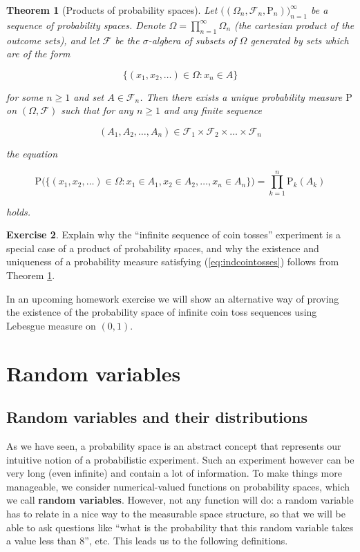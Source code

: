 \documentclass[11pt]{report}
\providecommand{\cal}{\mathcal}
\theoremstyle{plain}
\newtheorem{thm}{Theorem}[chapter]
\theoremstyle{definition}
\newtheorem{xexercise}[thm]{Exercise}
\begin{document}
\begin{thm}[Products of probability spaces]
\label{thm-productspaces}
Let
$\big((\Omega_n, {\cal F}_n,
\mathrm{P}_n)\big)_{n=1}^\infty$
be a sequence of probability spaces. Denote
$\Omega = \prod_{n=1}^\infty \Omega_n$ (the cartesian
product of the outcome sets), and let ${\cal F}$ be
the $\sigma$-algbera of subsets of $\Omega$ generated
by sets which are of the form

\[
\{ (x_1,x_2,\ldots) \in \Omega : x_n \in A \}
\]

for some $n\ge1$ and set $A \in {\cal F}_n$. Then
there exists a unique probability measure $\mathrm{P}$
on $(\Omega, {\cal F})$ such that for any $n\ge 1$
and any finite sequence

\[
(A_1, A_2, \ldots, A_n) \in {\cal F}_1 \times {\cal F}_2
\times \ldots \times {\cal F}_n
\]

the equation

\[
\mathrm{P}\Big(\big\{ (x_1,x_2,\ldots ) \in \Omega : x_1\in A_1, x_2 \in A_2, \ldots, x_n \in A_n \big\} \Big)
=
\prod_{k=1}^n \mathrm{P}_k(A_k)
\]

holds.
\end{thm}

\begin{xexercise}
Explain why the ``infinite sequence of coin tosses''
experiment is a special case of  a product of
probability spaces, and why the existence and
uniqueness of a probability measure satisfying
(\ref{eq:indcointosses}) follows from Theorem
\ref{thm-productspaces}.
\end{xexercise}

In an upcoming homework exercise we will show an
alternative way of proving the existence of the
probability space of infinite coin toss sequences
using Lebesgue measure on $(0,1)$.

\chapter{Random variables}

\section{Random variables and their distributions}
As we have seen, a probability space is an abstract
concept that represents our intuitive notion of a
probabilistic experiment. Such an experiment however
can be very long (even infinite) and contain a lot of
information. To make things more manageable, we
consider numerical-valued functions on probability
spaces, which we call \textbf{random variables}.
However, not any function will do: a random variable
has to relate in a nice way to the measurable space
structure, so that we will be able to ask questions
like ``what is the probability that this random
variable takes a value less than 8'', etc. This leads
us to the following definitions.
\end{document}
